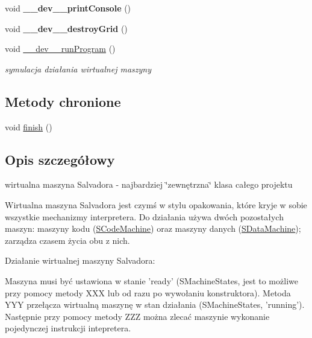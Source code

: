 \begin{CompactItemize}
\item 
\hypertarget{classSVirtualMachine_21b1ac24c7018fd084a553a66f5827ea}{
void \textbf{\_\-\_\-dev\_\-\_\-printConsole} ()}
\label{classSVirtualMachine_21b1ac24c7018fd084a553a66f5827ea}

\item 
\hypertarget{classSVirtualMachine_cf39eaf295cf709c43b8754aed84286f}{
void \textbf{\_\-\_\-dev\_\-\_\-destroyGrid} ()}
\label{classSVirtualMachine_cf39eaf295cf709c43b8754aed84286f}

\item 
void \hyperlink{classSVirtualMachine_d07f353daaf626f5efeb8bd34818db75}{\_\-\_\-dev\_\-\_\-runProgram} ()
\begin{CompactList}\small\item\em symulacja działania wirtualnej maszyny \item\end{CompactList}\end{CompactItemize}
\subsection*{Metody chronione}
\begin{CompactItemize}
\item 
void \hyperlink{classSVirtualMachine_5eb2195ecac5f0bed11b2318cf8feed2}{finish} ()
\end{CompactItemize}


\subsection{Opis szczegółowy}
wirtualna maszyna Salvadora - najbardziej \char`\"{}zewnętrzna\char`\"{} klasa całego projektu 

Wirtualna maszyna Salvadora jest czymś w stylu opakowania, które kryje w sobie wszystkie mechanizmy interpretera. Do działania używa dwóch pozostałych maszyn: maszyny kodu (\hyperlink{classSCodeMachine}{SCodeMachine}) oraz maszyny danych (\hyperlink{classSDataMachine}{SDataMachine}); zarządza czasem życia obu z nich.

Działanie wirtualnej maszyny Salvadora:

Maszyna musi być ustawiona w stanie 'ready' (SMachineStates, jest to możliwe przy pomocy metody XXX lub od razu po wywołaniu konstruktora). Metoda YYY przełącza wirtualną maszynę w stan działania (SMachineStates, 'running'). Następnie przy pomocy metody ZZZ można zlecać maszynie wykonanie pojedynczej instrukcji intepretera.

